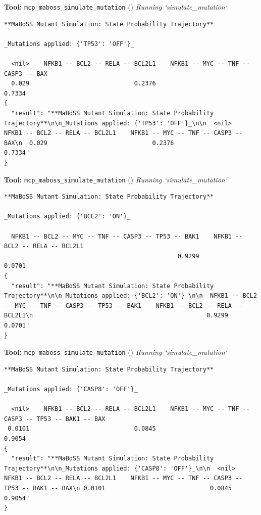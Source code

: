 \documentclass[11pt,a4paper]{article}
\begin{document}
\begin{toolokbox}
\textbf{Tool:} \texttt{mcp\_maboss\_simulate\_mutation} (\checkmark)
\textit{Running `simulate\_mutation`}
\begin{lstlisting}
**MaBoSS Mutant Simulation: State Probability Trajectory**

_Mutations applied: {'TP53': 'OFF'}_

  <nil>    NFKB1 -- BCL2 -- RELA -- BCL2L1    NFKB1 -- MYC -- TNF -- CASP3 -- BAX
  0.029                             0.2376                                 0.7334
{
  "result": "**MaBoSS Mutant Simulation: State Probability Trajectory**\n\n_Mutations applied: {'TP53': 'OFF'}_\n\n  <nil>    NFKB1 -- BCL2 -- RELA -- BCL2L1    NFKB1 -- MYC -- TNF -- CASP3 -- BAX\n  0.029                             0.2376                                 0.7334"
}
\end{lstlisting}
\end{toolokbox}
\begin{toolokbox}
\textbf{Tool:} \texttt{mcp\_maboss\_simulate\_mutation} (\checkmark)
\textit{Running `simulate\_mutation`}
\begin{lstlisting}
**MaBoSS Mutant Simulation: State Probability Trajectory**

_Mutations applied: {'BCL2': 'ON'}_

  NFKB1 -- BCL2 -- MYC -- TNF -- CASP3 -- TP53 -- BAK1    NFKB1 -- BCL2 -- RELA -- BCL2L1
                                                0.9299                             0.0701
{
  "result": "**MaBoSS Mutant Simulation: State Probability Trajectory**\n\n_Mutations applied: {'BCL2': 'ON'}_\n\n  NFKB1 -- BCL2 -- MYC -- TNF -- CASP3 -- TP53 -- BAK1    NFKB1 -- BCL2 -- RELA -- BCL2L1\n                                                0.9299                             0.0701"
}
\end{lstlisting}
\end{toolokbox}
\begin{toolokbox}
\textbf{Tool:} \texttt{mcp\_maboss\_simulate\_mutation} (\checkmark)
\textit{Running `simulate\_mutation`}
\begin{lstlisting}
**MaBoSS Mutant Simulation: State Probability Trajectory**

_Mutations applied: {'CASP8': 'OFF'}_

  <nil>    NFKB1 -- BCL2 -- RELA -- BCL2L1    NFKB1 -- MYC -- TNF -- CASP3 -- TP53 -- BAK1 -- BAX
 0.0101                             0.0845                                                 0.9054
{
  "result": "**MaBoSS Mutant Simulation: State Probability Trajectory**\n\n_Mutations applied: {'CASP8': 'OFF'}_\n\n  <nil>    NFKB1 -- BCL2 -- RELA -- BCL2L1    NFKB1 -- MYC -- TNF -- CASP3 -- TP53 -- BAK1 -- BAX\n 0.0101                             0.0845                                                 0.9054"
}
\end{lstlisting}
\end{toolokbox}
\end{document}
